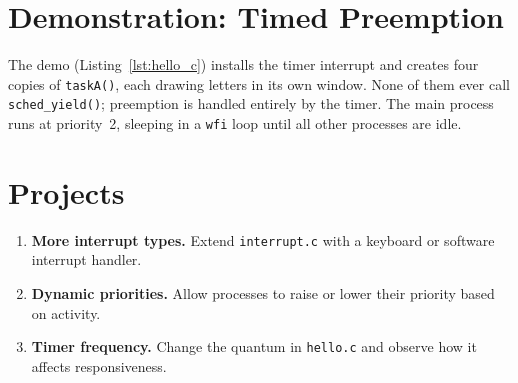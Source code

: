 \begin{figure}[H]
\centering

\end{figure}

\begin{figure}[H]
\centering

\end{figure}

\section{Demonstration: Timed Preemption}

The demo (Listing~\ref{lst:hello_c}) installs the timer interrupt and creates
four copies of \texttt{taskA()}, each drawing letters in its own window.
None of them ever call \texttt{sched\_yield()}; preemption is handled entirely
by the timer.  The main process runs at priority~2, sleeping in a
\texttt{wfi} loop until all other processes are idle.

\begin{figure}[H]
\centering

\end{figure}

\section*{Projects}

\begin{enumerate}
  \item \textbf{More interrupt types.} Extend \texttt{interrupt.c} with a
        keyboard or software interrupt handler.
  \item \textbf{Dynamic priorities.} Allow processes to raise or lower their
        priority based on activity.
  \item \textbf{Timer frequency.} Change the quantum in
        \texttt{hello.c} and observe how it affects responsiveness.
\end{enumerate}
